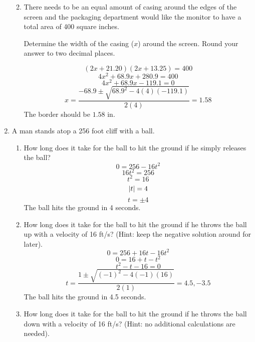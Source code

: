 \documentclass[letterpaper,12pt,fleqn]{article}
\begin{document}
\begin{enumerate}
\begin{enumerate}
    \bigskip

  \item There needs to be an equal amount of casing around the edges of the
    screen and the packaging department would like the monitor to have a total
    area of 400 square inches.

    \begin{figure}[h]
      \setlength{\leftskip}{1in}
    \end{figure}

    Determine the width of the casing ($x$) around the screen. Round your
    answer to two decimal places.

    \[(2x+21.20)(2x+13.25)=400\]
    \[4x^2+68.9x+280.9=400\]
    \[4x^2+68.9x-119.1=0\]
    \[x=\frac{-68.9\pm\sqrt{68.9^2-4(4)(-119.1)}}{2(4)}=1.58\]
    The border should be $1.58$ in.
  \end{enumerate}

  \bigskip

\item A man stands atop a 256 foot cliff with a ball.
  \begin{enumerate}
  \item How long does it take for the ball to hit the ground if he simply
    releases the ball?
    \[0=256-16t^2\]
    \[16t^2=256\]
    \[t^2=16\]
    \[\lvert t\rvert=4\]
    \[t=\pm4\]
    The ball hits the ground in 4 seconds.

    \bigskip

  \item How long does it take for the ball to hit the ground if he throws the
    ball up with a velocity of 16 ft/s? (Hint: keep the negative solution
    around for later).
    \[0=256+16t-16t^2\]
    \[0=16+t-t^2\]
    \[t^2-t-16=0\]
    \[t=\frac{1\pm\sqrt{(-1)^2-4(-1)(16)}}{2(1)}=4.5, -3.5\]
    The ball hits the ground in 4.5 seconds.

  \item How long does it take for the ball to hit the ground if he throws the
    ball down with a velocity of 16 ft/s? (Hint: no additional calculations
    are needed).


\end{enumerate}
\end{enumerate}
\end{document}
